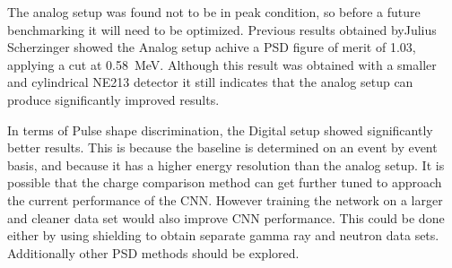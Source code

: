 \documentclass[main.tex]{subfiles}
\begin{document}
The analog setup was found not to be in peak condition, so before a future benchmarking it will need to be optimized. Previous results obtained byJulius Scherzinger showed the Analog setup achive a PSD figure of merit of 1.03, applying a cut at \SI{0.58}{\MeV}\cite{ScherzingerPhd}. Although this result was obtained with a smaller and cylindrical NE213 detector it still indicates that the analog setup can produce significantly improved results.

In terms of Pulse shape discrimination, the Digital setup showed significantly better results. This is because the baseline is determined on an event by event basis, and because it has a higher energy resolution than the analog setup. It is possible that the charge comparison method can get further tuned to approach the current performance of the CNN. However training the network on a larger and cleaner data set would also improve CNN performance. This could be done either by using shielding to obtain separate gamma ray and neutron data sets. Additionally other PSD methods should be explored.
\end{document}
